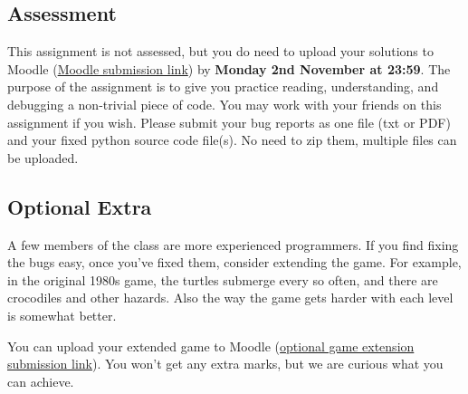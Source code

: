 \documentclass{article}
\begin{document}
\subsection*{Assessment}

This assignment is not assessed, but you do need to upload your solutions to Moodle (\href{https://moodle.ucl.ac.uk/mod/assign/view.php?id=9108708}{Moodle submission link}) by \textbf{Monday 2nd November at 23:59}.  The purpose of the assignment is to
give you practice reading, understanding, and debugging a non-trivial
piece of code.  You may work with your friends on this assignment if
you wish.  Please submit your bug reports as one file (txt or PDF) and your fixed python source code file(s).  No need to zip them, multiple files can be uploaded.

\subsection*{Optional Extra}

A few members of the class are more experienced programmers.  If you
find fixing the bugs easy, once you've fixed them, consider extending
the game.  For example, in the original 1980s game, the turtles submerge
every so often, and there are crocodiles and other hazards.  Also the
way the game gets harder with each level is somewhat better.

You can upload your extended game to Moodle (\href{https://moodle.ucl.ac.uk/mod/assign/view.php?id=9108709}{optional game extension submission link}).  You won't get any extra marks, but we are
curious what you can achieve.
\end{document}
